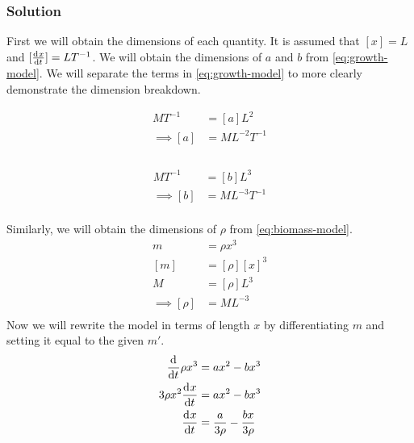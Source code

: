 \documentclass[12pt]{article}
\begin{document}
\subsubsection*{Solution}
First we will obtain the dimensions of each quantity. It is assumed that $[x]=L$
and $[\frac{\mathrm{d}^{} {x}}{\mathrm{d}{t}^{}}]=LT^{-1}$. We will obtain the dimensions of $a$ and $b$ from
\cref{eq:growth-model}. We will separate the terms in \cref{eq:growth-model} to
more clearly demonstrate the dimension breakdown.
\vspace{-2em}
\begin{multicols}{2}
  \begin{equation*}
    \begin{aligned}
      MT^{-1} &= [a]L^2 \\
      \implies [a] &= ML^{-2}T^{-1} \\
    \end{aligned}
  \end{equation*} \\
  \begin{equation*}
    \begin{aligned}
      MT^{-1} &= [b]L^3 \\
      \implies [b] &= ML^{-3}T^{-1} \\
    \end{aligned}
  \end{equation*}
\end{multicols}
\noindent
Similarly, we will obtain the dimensions of $\rho$ from \cref{eq:biomass-model}.
\begin{equation*}
  \begin{aligned}
    m &= \rho x^3 \\
    [m] &= [\rho] [x]^3 \\
    M &= [\rho] L^3 \\
    \implies [\rho] &= ML^{-3} \\
  \end{aligned}
\end{equation*}
Now we will rewrite the model in terms of length $x$ by differentiating $m$ and
setting it equal to the given $m'$.
\begin{equation}
  \begin{aligned}
    \label{eq:model-in-terms-of-x}
    \frac{\mathrm{d}^{} {}}{\mathrm{d}{t}^{}}\rho x^3 &= ax^2-bx^3 \\
    3\rho x^2\frac{\mathrm{d}^{} {x}}{\mathrm{d}{t}^{}} &= ax^2-bx^3 \\
    \frac{\mathrm{d}^{} {x}}{\mathrm{d}{t}^{}} &= \frac{a}{3\rho} - \frac{bx}{3\rho} \\
  \end{aligned}
\end{equation}
\end{document}

